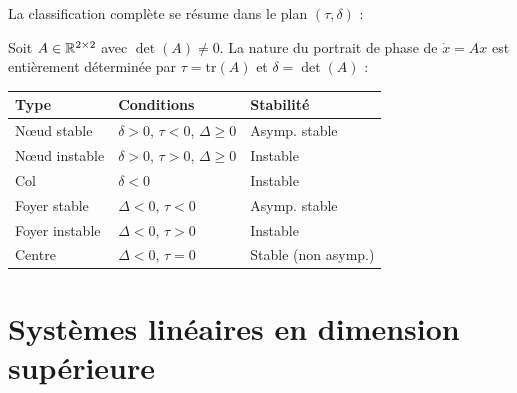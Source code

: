 La classification compl\`ete se r\'esume dans le plan $(\tau, \delta)$ :

\begin{center}
\end{center}

\begin{theoreme}
Soit $A \in \mathbb{R}^{2\times 2}$ avec $\det(A) \neq 0$. La nature du portrait de
phase de $\dot{x} = Ax$ est enti\`erement d\'etermin\'ee par
$\tau = \mathrm{tr}(A)$ et $\delta = \det(A)$ :
\begin{center}
\begin{tabular}{lll}
\hline
\textbf{Type} & \textbf{Conditions} & \textbf{Stabilit\'e} \\
\hline
N\oe ud stable & $\delta > 0$, $\tau < 0$, $\Delta \geq 0$ & Asymp. stable \\
N\oe ud instable & $\delta > 0$, $\tau > 0$, $\Delta \geq 0$ & Instable \\
Col & $\delta < 0$ & Instable \\
Foyer stable & $\Delta < 0$, $\tau < 0$ & Asymp. stable \\
Foyer instable & $\Delta < 0$, $\tau > 0$ & Instable \\
Centre & $\Delta < 0$, $\tau = 0$ & Stable (non asymp.) \\
\hline
\end{tabular}
\end{center}
\end{theoreme}

\section{Syst\`emes lin\'eaires en dimension sup\'erieure}

